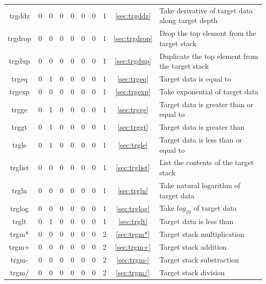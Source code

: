 \documentclass[a4paper,10pt]{report}
\begin{document}
\begin{center}
\begin{longtable}{|c|c|c|c|c|c|c|c|c|l|}
    trgddz \index{b2plot, trgddz}   & 0 & 0 & 0 & 0 & 0 & 0 & 1 & \ref{sec:trgddz}   & Take derivative of target data along target depth \\
    trgdrop \index{b2plot, trgdrop}  & 0 & 0 & 0 & 0 & 0 & 0 & 1 & \ref{sec:trgdrop}  & Drop the top element from the target stack \\
    trgdup \index{b2plot, trgdup}   & 0 & 0 & 0 & 0 & 0 & 0 & 1 & \ref{sec:trgdup}   & Duplicate the top element from the target stack \\
    trgeq \index{b2plot, trgeq}    & 0 & 1 & 0 & 0 & 0 & 0 & 1 & \ref{sec:trgeq}    & Target data is equal to \\
    trgexp \index{b2plot, trgexp}   & 0 & 0 & 0 & 0 & 0 & 0 & 1 & \ref{sec:trgexp}   & Take exponential of target data \\
    trgge \index{b2plot, trgge}    & 0 & 1 & 0 & 0 & 0 & 0 & 1 & \ref{sec:trgge}    & Target data is greater than or equal to \\
    trggt \index{b2plot, trggt}    & 0 & 1 & 0 & 0 & 0 & 0 & 1 & \ref{sec:trggt}    & Target data is greater than \\
    trgle \index{b2plot, trgle}    & 0 & 1 & 0 & 0 & 0 & 0 & 1 & \ref{sec:trgle}    & Target data is less than or equal to \\
    trglist \index{b2plot, trglist}  & 0 & 0 & 0 & 0 & 0 & 0 & 1 & \ref{sec:trglist}  & List the contents of the target stack \\
    trgln \index{b2plot, trgln}    & 0 & 0 & 0 & 0 & 0 & 0 & 1 & \ref{sec:trgln}    & Take natural logarithm of target data \\
    trglog \index{b2plot, trglog}   & 0 & 0 & 0 & 0 & 0 & 0 & 1 & \ref{sec:trglog}   & Take $log_{10}$ of target data \\
    trglt \index{b2plot, trglt}    & 0 & 1 & 0 & 0 & 0 & 0 & 1 & \ref{sec:trglt}    & Target data is less than \\
    trgm* \index{b2plot, trgm*}    & 0 & 0 & 0 & 0 & 0 & 0 & 2 & \ref{sec:trgm*}    & Target stack multiplication \\
    trgm+ \index{b2plot, trgm+}    & 0 & 0 & 0 & 0 & 0 & 0 & 2 & \ref{sec:trgm+}    & Target stack addition \\
    trgm- \index{b2plot, trgm-}    & 0 & 0 & 0 & 0 & 0 & 0 & 2 & \ref{sec:trgm-}    & Target stack substraction \\
    trgm/ \index{b2plot, trgm/}    & 0 & 0 & 0 & 0 & 0 & 0 & 2 & \ref{sec:trgm/}    & Target stack division \\

\end{longtable}
\end{center}
\end{document}
